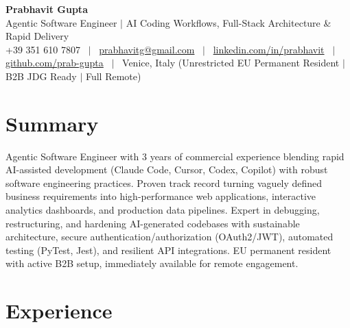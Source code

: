\documentclass[a4paper,10pt]{article}
\begin{document}
\begin{minipage}[c]{0.80\textwidth}
  {\Huge\bfseries Prabhavit Gupta}\\[3pt]
  {\color{accent}\large Agentic Software Engineer $\vert$ AI Coding Workflows, Full-Stack Architecture \& Rapid Delivery}\\[6pt]
  {\footnotesize +39 351 610 7807 ~$\vert$~
  \href{mailto:prabhavitg@gmail.com}{prabhavitg@gmail.com} ~$\vert$~
  \href{https://www.linkedin.com/in/prabhavit/}{linkedin.com/in/prabhavit} ~$\vert$~
  \href{https://github.com/prab-gupta}{github.com/prab-gupta} ~$\vert$~
  Venice, Italy (Unrestricted EU Permanent Resident $\vert$ B2B JDG Ready $\vert$ Full Remote)}
\end{minipage}\hfill

\section{Summary}
Agentic Software Engineer with 3 years of commercial experience blending rapid AI-assisted development (Claude Code, Cursor, Codex, Copilot) with robust software engineering practices. Proven track record turning vaguely defined business requirements into high-performance web applications, interactive analytics dashboards, and production data pipelines. Expert in debugging, restructuring, and hardening AI-generated codebases with sustainable architecture, secure authentication/authorization (OAuth2/JWT), automated testing (PyTest, Jest), and resilient API integrations. EU permanent resident with active B2B setup, immediately available for remote engagement.

\section{Experience}
\end{document}
